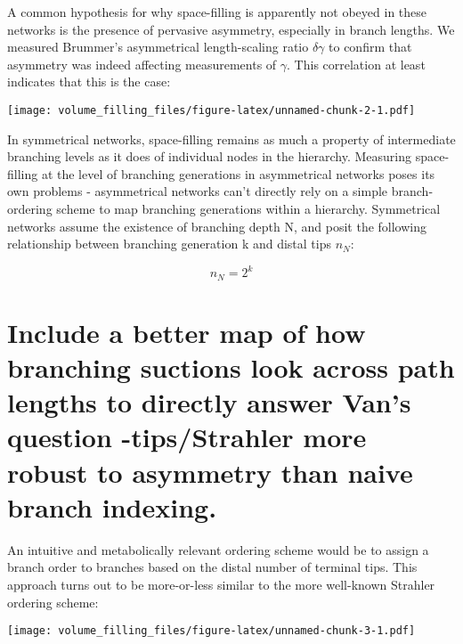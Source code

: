 \documentclass[]{article}
\begin{document}
A common hypothesis for why space-filling is apparently not obeyed in
these networks is the presence of pervasive asymmetry, especially in
branch lengths. We measured Brummer's asymmetrical length-scaling ratio
\(\delta\gamma\) to confirm that asymmetry was indeed affecting
measurements of \(\gamma\). This correlation at least indicates that
this is the case:

\texttt{[image: volume\_filling\_files/figure-latex/unnamed-chunk-2-1.pdf]}

In symmetrical networks, space-filling remains as much a property of
intermediate branching levels as it does of individual nodes in the
hierarchy. Measuring space-filling at the level of branching generations
in asymmetrical networks poses its own problems - asymmetrical networks
can't directly rely on a simple branch-ordering scheme to map branching
generations within a hierarchy. Symmetrical networks assume the
existence of branching depth N, and posit the following relationship
between branching generation k and distal tips \(n_{N}\):

\begin{equation}
n_{N} = 2^{k}
\end{equation}

\section{Include a better map of how branching suctions look across path
lengths to directly answer Van's question -tips/Strahler more robust to
asymmetry than naive branch
indexing.}\label{include-a-better-map-of-how-branching-suctions-look-across-path-lengths-to-directly-answer-vans-question--tipsstrahler-more-robust-to-asymmetry-than-naive-branch-indexing.}

An intuitive and metabolically relevant ordering scheme would be to
assign a branch order to branches based on the distal number of terminal
tips. This approach turns out to be more-or-less similar to the more
well-known Strahler ordering scheme:

\texttt{[image: volume\_filling\_files/figure-latex/unnamed-chunk-3-1.pdf]}
\end{document}

